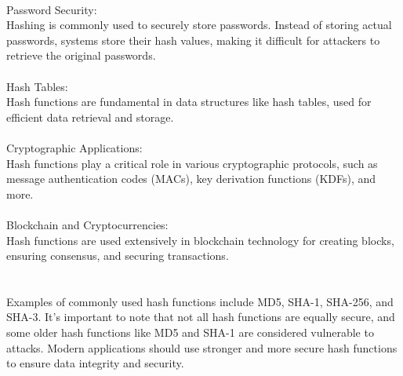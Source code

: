 \documentclass{report}
\begin{document}
\\
Password Security:\\
 Hashing is commonly used to securely store passwords. Instead of storing actual passwords, systems store their hash values, making it difficult for attackers to retrieve the original passwords.\\
\\
Hash Tables:\\
 Hash functions are fundamental in data structures like hash tables, used for efficient data retrieval and storage.\\
\\
Cryptographic Applications: \\
Hash functions play a critical role in various cryptographic protocols, such as message authentication codes (MACs), key derivation functions (KDFs), and more.\\
\\
Blockchain and Cryptocurrencies:\\
 Hash functions are used extensively in blockchain technology for creating blocks, ensuring consensus, and securing transactions.\\
\\
\\
Examples of commonly used hash functions include MD5, SHA-1, SHA-256, and SHA-3. It's important to note that not all hash functions are equally secure, and some older hash functions like MD5 and SHA-1 are considered vulnerable to attacks. Modern applications should use stronger and more secure hash functions to ensure data integrity and security.
\end{document}
